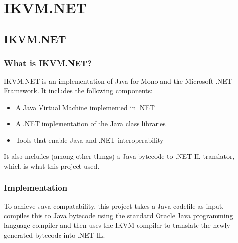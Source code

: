\chapter{IKVM.NET}

\section{IKVM.NET}

\subsection{What is IKVM.NET?}
IKVM.NET is an implementation of Java for Mono and the Microsoft .NET Framework. It includes the following components:

\begin{itemize}
	\item A Java Virtual Machine implemented in .NET
	\item A .NET implementation of the Java class libraries
	\item Tools that enable Java and .NET interoperability
\end{itemize}

It also includes (among other things) a Java bytecode to .NET IL translator, which is what this project used.

\subsection{Implementation}
To achieve Java compatability, this project takes a Java codefile as input, compiles this to Java bytecode using the standard Oracle Java programming language compiler and then uses the IKVM compiler to translate the newly generated bytecode into .NET IL.

